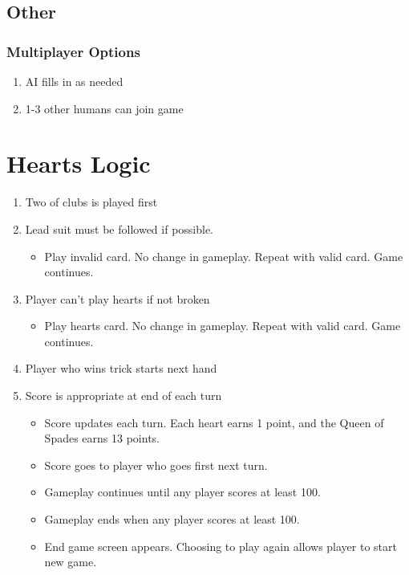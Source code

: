 \documentclass[11pt, titlepage]{article}
\begin{document}
\subsection{Other}
	\subsubsection{Multiplayer Options}
		\begin{enumerate}
			\item AI fills in as needed
			\item 1-3 other humans can join game
		\end{enumerate}

\section{Hearts Logic}
	\begin{enumerate}
		\item Two of clubs is played first
		\item Lead suit must be followed if possible.
		\begin{itemize}
			\item Play invalid card.  No change in gameplay.  Repeat with valid card.  Game continues.
		\end{itemize}
		\item Player can't play hearts if not broken
		\begin{itemize}
			\item Play hearts card.  No change in gameplay.  Repeat with valid card.  Game continues.
		\end{itemize}
		\item Player who wins trick starts next hand
		\item Score is appropriate at end of each turn
		\begin{itemize}
			\item Score updates each turn. Each heart earns 1 point, and the Queen of Spades earns 13 points.
			\item Score goes to player who goes first next turn.
			\item Gameplay continues until any player scores at least 100.
			\item Gameplay ends when any player scores at least 100.
			\item End game screen appears.  Choosing to play again allows player to start new game.
		\end{itemize}
	\end{enumerate}
\end{document}
